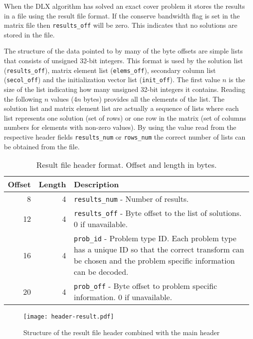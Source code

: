 When the DLX algorithm has solved an exact cover problem it stores the results in a file using the result file format.
If the conserve bandwidth flag is set in the matrix file then \texttt{results\_off} will be zero.
This indicates that no solutions are stored in the file.

The structure of the data pointed to by many of the byte offsets are simple lists that consists of unsigned 32-bit integers.
This format is used by the solution list (\texttt{results\_off}), matrix element list (\texttt{elems\_off}), secondary column list (\texttt{secol\_off}) and the initialization vector list (\texttt{init\_off}).
The first value $n$ is the size of the list indicating how many unsigned 32-bit integers it contains.
Reading the following $n$ values ($4n$ bytes) provides all the elements of the list.
The solution list and matrix element list are actually a sequence of lists where each list represents one solution (set of rows) or one row in the matrix (set of columns numbers for elements with non-zero values).
By using the value read from the respective header fields \texttt{results\_num} or \texttt{rows\_num} the correct number of lists can be obtained from the file.

\begin{table}[htbp]
	\centering
	\begin{tabular}{|r|r|p{3.2in}|}
		\hline
		\bf Offset & \bf Length & \bf Description \\ \hline
		8  & 4 & \texttt{results\_num} - Number of results. \\ \hline
		12 & 4 & \texttt{results\_off} - Byte offset to the list of solutions. 0 if unavailable. \\ \hline
		16 & 4 & \texttt{prob\_id} - Problem type ID. Each problem type has a unique ID so that the correct transform can be chosen and the problem specific information can be decoded. \\ \hline
		20 & 4 & \texttt{prob\_off} - Byte offset to problem specific information. 0 if unavailable. \\ \hline
	\end{tabular}
	\caption{Result file header format. Offset and length in bytes.}
	\label{tab:header-result}
\end{table}

\begin{figure}[htbp]
	\centering
	\texttt{[image: header-result.pdf]}
	\caption{Structure of the result file header combined with the main header}
	\label{fig:header-result}
\end{figure}



